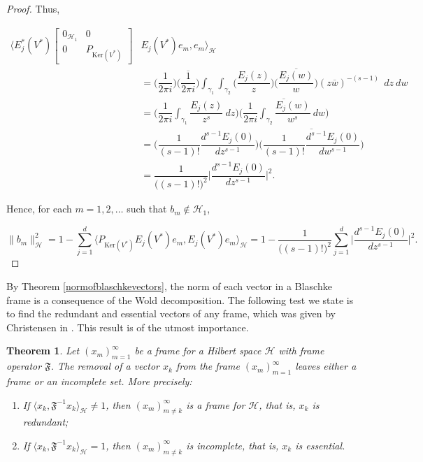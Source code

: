 \documentclass[10pt, reqno]{amsart}
\newtheorem{theorem}{Theorem}[section]
\theoremstyle{definition}
\numberwithin{equation}{section}
\begin{document}
\begin{proof}
\noindent Thus,

\begin{align*}
\bigg\langle E^{*}_{j}(V^{*})\begin{bmatrix}
0_{\mathcal{H}_{1}} & 0\\
0& P_{\mathrm{Ker}(V^{*})}
\end{bmatrix}&E_{j}(V^{*})e_{m},e_{m}\bigg\rangle_{\mathcal{H}}\\
&=\Big(\dfrac{1}{2\pi i}\Big)\overline{\Big(\dfrac{1}{2\pi i}\Big)}\int_{\gamma_{1}}\int_{\gamma_{2}}\bigg(\dfrac{E_{j}(z)}{z}\bigg)\bigg(\overline{\dfrac{E_{j}(w)}{w}}\bigg)(z\overline{w})^{-(s-1)}~~dz~dw\\
&= \bigg(\dfrac{1}{2\pi i}\int_{\gamma_{1}} \dfrac{E_{j}(z)}{z^{s}}~dz\bigg)\overline{\bigg(\dfrac{1}{2\pi i}\int_{\gamma_{2}}\dfrac{E_{j}(w)}{w^{s}}~dw\bigg)}\\
&=\Bigg(\dfrac{1}{(s-1)!}\dfrac{d^{s-1}E_{j}(0)}{dz^{s-1}}\Bigg)\overline{\Bigg(\dfrac{1}{(s-1)!}\dfrac{d^{s-1}E_{j}(0)}{dw^{s-1}}\Bigg)}\\
&=\dfrac{1}{\big((s-1)!\big)^{2}}\Bigg\lvert\dfrac{d^{s-1}E_{j}(0)}{dz^{s-1}}\Bigg\rvert^{2}.
\end{align*}

\noindent Hence, for each $m=1,2,\hdots$ such that $b_{m}\not\in\mathcal{H}_{1}$,

$$\|b_{m}\|_{\mathcal{H}}^{2} = 1 - \sum_{j=1}^{d}\bigg\langle P_{\mathrm{Ker}(V^{*})}E_{j}(V^{*})e_{m},E_{j}(V^{*})e_{m}\bigg\rangle_{\mathcal{H}}
    = 1 - \dfrac{1}{\big((s-1)!\big)^{2}}\sum_{j=1}^{d}\Bigg\lvert\dfrac{d^{s-1}E_{j}(0)}{dz^{s-1}}\Bigg\rvert^{2}.$$\end{proof}

    By Theorem \ref{normofblaschkevectors}, the norm of each vector in a Blaschke frame is a consequence of the Wold decomposition. The following test we state is to find the redundant and essential vectors of any frame, which was given by Christensen in \cite{Christensen}. This result is of the utmost importance. 

\begin{theorem}{}\label{redundancyresult}
Let $(x_{m})_{m=1}^{\infty}$ be a frame for a Hilbert space $\mathcal{H}$ with frame operator $\mathfrak{F}$. The removal of a vector $x_{k}$ from the frame $(x_{m})_{m=1}^{\infty}$ leaves either a frame or an incomplete set. More precisely:
    
    \begin{enumerate}
        \item If $\langle x_{k}, \mathfrak{F}^{-1}x_{k}\rangle_{\mathcal{H}}\neq 1$, then $(x_{m})_{m\neq k}^{\infty}$ is a frame for $\mathcal{H}$, that is, $x_{k}$ is redundant;
         \item  If $\langle x_{k}, \mathfrak{F}^{-1}x_{k}\rangle_{\mathcal{H}}=1$, then $(x_{m})_{m\neq k}^{\infty}$ is incomplete, that is, $x_{k}$ is essential.
    \end{enumerate}
    
\end{theorem}
\end{document}
